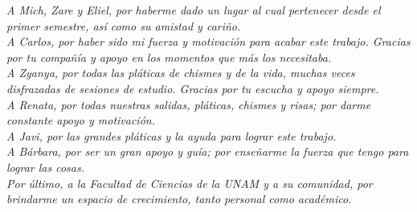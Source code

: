 \textit{A Mich, Zare y Eliel, por haberme dado un lugar al cual pertenecer desde
el primer semestre, as\'i como su amistad y cari\~{n}o.}\\

\textit{A Carlos, por haber sido mi fuerza y motivaci\'on para acabar este
trabajo. Gracias por tu compa\~{n}\'ia y apoyo en los momentos que m\'as los
necesitaba.}\\

\textit{A Zyanya, por todas las pl\'aticas de chismes y de la vida, muchas veces
disfrazadas de sesiones de estudio. Gracias por tu escucha y apoyo siempre.}\\

\textit{A Renata, por todas nuestras salidas, pl\'aticas, chismes y risas; por
darme constante apoyo y motivaci\'on.}\\

\textit{A Javi, por las grandes pl\'aticas y la ayuda para lograr este trabajo.}\\

\textit{A B\'arbara, por ser un gran apoyo y gu\'ia; por ense\~{n}arme la fuerza
que tengo para lograr las cosas.}\\

\textit{Por \'ultimo, a la Facultad de Ciencias de la UNAM y a su comunidad, por
brindarme un espacio de crecimiento, tanto personal como acad\'emico.}